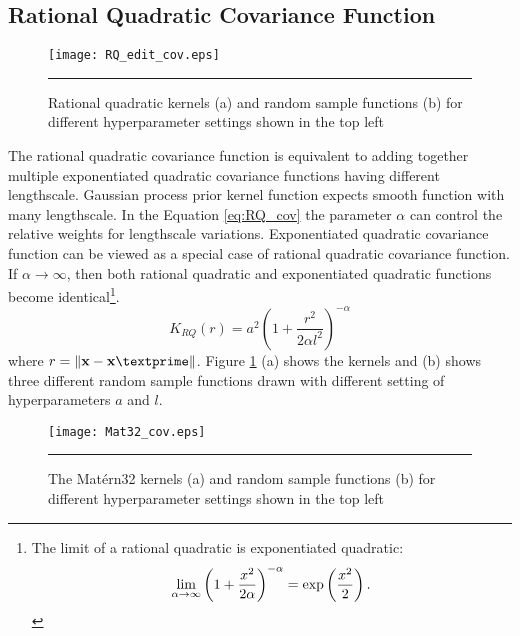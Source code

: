 \subsection{Rational Quadratic Covariance Function}
\begin{figure}
	\centering
		\texttt{[image: RQ\_edit\_cov.eps]}
		\rule{35em}{0.5pt}
	\caption[Rational quadratic kernels and random sample functions]
		{Rational quadratic kernels (a) and random sample functions (b) for different hyperparameter settings shown in the top left}
	\label{fig:Rational_Quadratic_covariance}
\end{figure}
The rational quadratic covariance function is equivalent to adding together multiple exponentiated quadratic covariance functions having different lengthscale. Gaussian process prior kernel function expects smooth function with many lengthscale. In the Equation \ref{eq:RQ_cov} the parameter $\alpha$ can control the relative weights for lengthscale variations. Exponentiated quadratic covariance function can be viewed as a special case of rational quadratic covariance function. If $\alpha \to \infty$, then both rational quadratic and exponentiated quadratic functions become identical\footnote{The limit of a rational quadratic is exponentiated quadratic: $$\lim_{\alpha \to \infty} \left(1+\frac{x^2}{2\alpha}\right)^{-\alpha}=\exp\left(\-\frac{x^2}{2} \right).$$}.
\begin{equation} \label{eq:RQ_cov}
K_{RQ}(r)= a^2 \left(1+ \frac{r^2}{2 \alpha l^2}\right)^{-\alpha}
\end{equation}
where $r=\lVert \textbf{x}-\textbf{x}\textprime \rVert$. Figure \ref{fig:Rational_Quadratic_covariance} (a) shows the kernels and (b) shows three different random sample functions drawn with different setting of hyperparameters $a$ and $l$.
\begin{figure}[t]
	\centering
		\texttt{[image: Mat32\_cov.eps]}
		\rule{35em}{0.5pt}
	\caption[The Mat{\'e}rn32 kernels and random sample functions]
		{The Mat{\'e}rn32 kernels (a) and random sample functions (b) for different hyperparameter settings shown in the top left}
	\label{fig:Matern32_covariance}
\end{figure}


